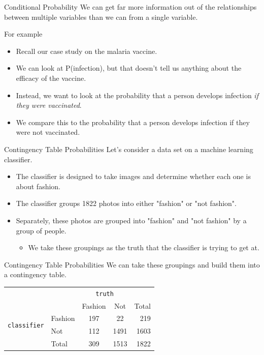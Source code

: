\begin{frame}{Conditional Probability}
    We can get far more information out of the relationships between multiple variables than we can from a single variable.
    
    For example
    \begin{itemize}
        \item Recall our case study on the malaria vaccine.
        \item We can look at P(infection), but that doesn't tell us anything about the efficacy of the vaccine.
        \item Instead, we want to look at the probability that a person develops infection \textit{if they were vaccinated}.
        \item We compare this to the probability that a person develops infection if they were not vaccinated.
    \end{itemize}
\end{frame}

\begin{frame}{Contingency Table Probabilities}
    Let's consider a data set on a machine learning classifier. 
    \begin{itemize}
        \item The classifier is designed to take images and determine whether each one is about fashion.
        \item The classifier groups 1822 photos into either "fashion" or "not fashion".
        \item Separately, these photos are grouped into "fashion" and "not fashion" by a group of people.
        \begin{itemize}
            \item We take these groupings as the truth that the classifier is trying to get at.
        \end{itemize}
    \end{itemize}
\end{frame}

\begin{frame}{Contingency Table Probabilities}
    We can take these groupings and build them into a contingency table.
    \begin{center}
        \begin{tabular}{r l cc r}
		& & \multicolumn{2}{c}{{\texttt{truth}}} & \\
        \cline{3-4}
		& & Fashion & Not & Total  \\ 
        \cline{2-5}
        \multirow{2}{*}{{\texttt{classifier}}} 
        & Fashion   & 197 & 22 & 219 \\ 
  		& Not       & 112 & 1491 & 1603 \\ 
        \cline{2-5}
  		& Total	& 309 & 1513 & 1822 \\
        \cline{2-5}
    \end{tabular}
    \end{center}
\end{frame}

